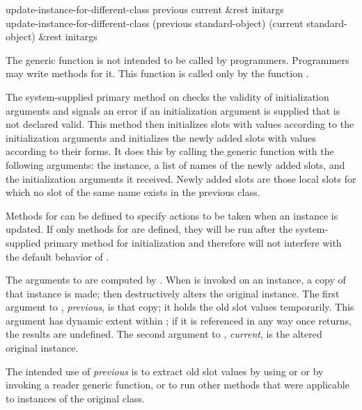 \begin{defun}
update-instance-for-different-class previous current &rest initargs \\
update-instance-for-different-class (previous standard-object)
     (current standard-object) &rest initargs

The generic function  is not
intended to be called by programmers.  Programmers may write
methods for it.  This function is called only by the function .

The system-supplied primary method on 
 checks the validity of
initialization arguments and signals an error if an initialization
argument is supplied that is not declared valid.  This method then
initializes slots with values according to the initialization
arguments and initializes the newly added slots with values according
to their  forms.  It does this by calling the generic
function  with the following arguments: the instance,
a list of names of the newly added slots, and the initialization
arguments it received.  Newly added slots are those local slots for which
no slot of the same name exists in the previous class.

Methods for
can be defined to
specify actions to be taken when an instance is updated.  If only 
 methods for  are
defined, they will be run after the system-supplied primary method for
initialization and therefore will not interfere with the default
behavior of .

The arguments to  are
computed by .  When  is invoked on
an instance, a copy of that instance is made;  then
destructively alters the original instance.  The first argument to
, \emph{previous}, is that
copy; it holds the old slot values temporarily.  This argument has
dynamic extent within ; if it is referenced in any
way once  returns, the
results are undefined.  The second argument to 
, \emph{current}, is the altered
original instance.

The intended use of \emph{previous} is to extract old slot values by using
 or  or by invoking a reader generic
function, or to run other methods that were applicable to instances of
the original class.


\end{defun}
